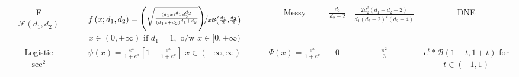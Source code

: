 \documentclass[10pt,landscape]{article}
\begin{document}
\begin{minipage}{.80\linewidth}
{\begin{tabular}{ccccccc}
&\shortstack{F \\ $ \mathcal{F}(d_1,d_2) $} & \shortstack{$ f\left(x ; d_{1}, d_{2}\right)=\nicefrac{\left(\sqrt{\frac{\left(d_{1} x\right)^{d_{1}} d_{2}^{d_{2}}}{\left(d_{1} x+d_{2}\right)^{d_{1}+d_{2}}}}\right)}{x \mathcal{B}\left(\frac{d_{1}}{2}, \frac{d_{2}}{2}\right)} $\\$ x \in(0,+\infty) \text { if } d_{1}=1, \text { o/w } x \in[0,+\infty) $} & Messy & $ \frac{d_{2}}{d_{2}-2} $ & $ \frac{2 d_{2}^{2}\left(d_{1}+d_{2}-2\right)}{d_{1}\left(d_{2}-2\right)^{2}\left(d_{2}-4\right)} $ & DNE\\
\cmidrule(l{2pt}r{2pt}){2-7}

&\shortstack{Logistic \\ $\sec^2$} & \shortstack{$ \psi(x)=\frac{e^x}{1+e^x}\left[ 1-\frac{e^x}{1+e^x} \right] $\\$x \in (-\infty, \infty)$} & $ \Psi(x)= \frac{e^x}{1+e^x} $ & 0 & $\frac{\pi^2}{3} $ & \shortstack{ $ e^t *\mathcal{B}(1-t,1+t) $ \\ for $ t\in(-1,1) $}\\

\bottomrule
\end{tabular}

}

\end{minipage}
%
%
%	
%
%
%
\end{document}
